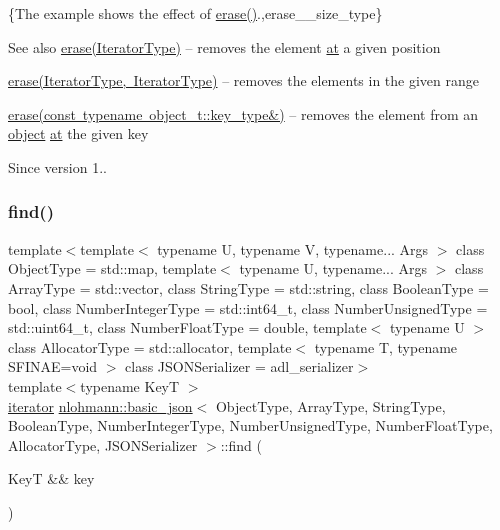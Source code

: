 \{The example shows the effect of {\ttfamily \mbox{\hyperlink{classnlohmann_1_1basic__json_a068a16e76be178e83da6a192916923ed}{erase()}}}.,erase\+\_\+\+\_\+size\+\_\+type\}

\begin{DoxySeeAlso}{See also}
\mbox{\hyperlink{classnlohmann_1_1basic__json_a068a16e76be178e83da6a192916923ed}{erase(\+Iterator\+Type)}} -- removes the element \mbox{\hyperlink{classnlohmann_1_1basic__json_a73ae333487310e3302135189ce8ff5d8}{at}} a given position 

\mbox{\hyperlink{classnlohmann_1_1basic__json_a4b3f7eb2d4625d95a51fbbdceb7c5f39}{erase(\+Iterator\+Type, Iterator\+Type)}} -- removes the elements in the given range 

\mbox{\hyperlink{classnlohmann_1_1basic__json_a2f8484d69c55d8f2a9697a7bec29362a}{erase(const typename object\+\_\+t\+::key\+\_\+type\&)}} -- removes the element from an \mbox{\hyperlink{classnlohmann_1_1basic__json_a31f84ee15c4690ff705bed74736d04c6}{object}} \mbox{\hyperlink{classnlohmann_1_1basic__json_a73ae333487310e3302135189ce8ff5d8}{at}} the given key
\end{DoxySeeAlso}
\begin{DoxySince}{Since}
version 1.. 
\end{DoxySince}
\mbox{\label{classnlohmann_1_1basic__json_a89eb3928f57903677051c80534be9cb1}} 
\subsubsection{\texorpdfstring{find()}{find()}\hspace{0.1cm}{\footnotesize\ttfamily [1/2]}}
{\footnotesize\ttfamily template$<$template$<$ typename U, typename V, typename... Args $>$ class Object\+Type = std\+::map, template$<$ typename U, typename... Args $>$ class Array\+Type = std\+::vector, class String\+Type  = std\+::string, class Boolean\+Type  = bool, class Number\+Integer\+Type  = std\+::int64\+\_\+t, class Number\+Unsigned\+Type  = std\+::uint64\+\_\+t, class Number\+Float\+Type  = double, template$<$ typename U $>$ class Allocator\+Type = std\+::allocator, template$<$ typename T, typename S\+F\+I\+N\+A\+E=void $>$ class J\+S\+O\+N\+Serializer = adl\+\_\+serializer$>$ \\
template$<$typename KeyT $>$ \\
\mbox{\hyperlink{classnlohmann_1_1basic__json_a099316232c76c034030a38faa6e34dca}{iterator}} \mbox{\hyperlink{classnlohmann_1_1basic__json}{nlohmann\+::basic\+\_\+json}}$<$ Object\+Type, Array\+Type, String\+Type, Boolean\+Type, Number\+Integer\+Type, Number\+Unsigned\+Type, Number\+Float\+Type, Allocator\+Type, J\+S\+O\+N\+Serializer $>$\+::find (\begin{DoxyParamCaption}\item[{KeyT \&\&}]{key }\end{DoxyParamCaption})\hspace{0.3cm}{\ttfamily [inline]}}




